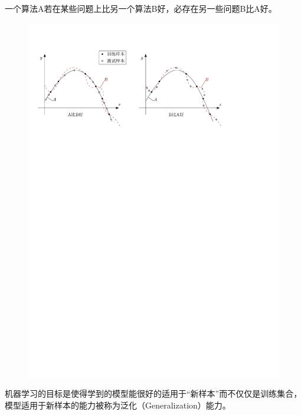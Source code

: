 \begin{theorem}[NFL定理]
    一个算法A若在某些问题上比另一个算法B好，必存在另一些问题B比A好。
\end{theorem}
\begin{figure}[htbp]
    \centering
    \includegraphics{image/NFL.pdf}
\end{figure}

\begin{definition}[泛化能力]
    机器学习的目标是使得学到的模型能很好的适用于“新样本”而不仅仅是训练集合，模型适用于新样本的能力被称为\textcolor{main1}{泛化（Generalization）能力}。
\end{definition}

